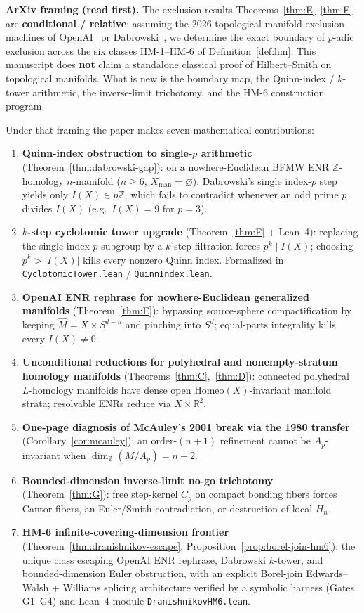 \documentclass[11pt]{article}
\theoremstyle{definition}
\begin{document}
\begin{checkboxenv}
\textbf{ArXiv framing (read first).}
The exclusion results Theorems~\ref{thm:E}--\ref{thm:F} are
\textbf{conditional / relative}: assuming the 2026 topological-manifold
exclusion machines of OpenAI~\cite{openai2026} or
Dabrowski~\cite{dabrowski2026}, we determine the exact boundary of $p$-adic
exclusion across the six classes HM-1--HM-6 of Definition~\ref{def:hm}.
This manuscript does \textbf{not} claim a standalone classical proof of
Hilbert--Smith on topological manifolds.  What is new is the boundary map,
the Quinn-index / $k$-tower arithmetic, the inverse-limit trichotomy, and the
HM-6 construction program.
\end{checkboxenv}

Under that framing the paper makes seven mathematical contributions:
\begin{enumerate}[label=\textbf{C\arabic*.}]
\item \textbf{Quinn-index obstruction to single-$p$ arithmetic}
(Theorem~\ref{thm:dabrowski-gap}):
on a nowhere-Euclidean BFMW ENR $\mathbb{Z}$-homology $n$-manifold
($n\ge 6$, $X_{\mathrm{man}}=\varnothing$), Dabrowski's single index-$p$ step
yields only $I(X)\in p\mathbb{Z}$, which fails to contradict whenever an odd
prime $p$ divides $I(X)$ (e.g.\ $I(X)=9$ for $p=3$).
\item \textbf{$k$-step cyclotomic tower upgrade}
(Theorem~\ref{thm:F} + Lean~4):
replacing the single index-$p$ subgroup by a $k$-step filtration forces
$p^k\mid I(X)$; choosing $p^k>|I(X)|$ kills every nonzero Quinn index.
Formalized in \texttt{CyclotomicTower.lean} / \texttt{QuinnIndex.lean}.
\item \textbf{OpenAI ENR rephrase for nowhere-Euclidean generalized manifolds}
(Theorem~\ref{thm:E}):
bypassing source-sphere compactification by keeping
$\widehat{M}=X\times S^{d-n}$ and pinching into $S^d$; equal-parts
integrality kills every $I(X)\neq 0$.
\item \textbf{Unconditional reductions for polyhedral and nonempty-stratum
homology manifolds}
(Theorems~\ref{thm:C},~\ref{thm:D}):
connected polyhedral $L$-homology manifolds have dense open
$\mathrm{Homeo}(X)$-invariant manifold strata; resolvable ENRs reduce via
$X\times\mathbb{R}^2$.
\item \textbf{One-page diagnosis of McAuley's 2001 break via the 1980 transfer}
(Corollary~\ref{cor:mcauley}):
an order-$(n+1)$ refinement cannot be $A_p$-invariant when
$\dim_{\mathbb{Z}}(M/A_p)=n+2$.
\item \textbf{Bounded-dimension inverse-limit no-go trichotomy}
(Theorem~\ref{thm:G}):
free step-kernel $C_p$ on compact bonding fibers forces Cantor fibers, an
Euler/Smith contradiction, or destruction of local $H_n$.
\item \textbf{HM-6 infinite-covering-dimension frontier}
(Theorem~\ref{thm:dranishnikov-escape},
Proposition~\ref{prop:borel-join-hm6}):
the unique class escaping OpenAI ENR rephrase, Dabrowski $k$-tower, and
bounded-dimension Euler obstruction, with an explicit Borel-join
Edwards--Walsh + Williams splicing architecture verified by a symbolic
harness (Gates G1--G4) and Lean~4 module \texttt{DranishnikovHM6.lean}.
\end{enumerate}
\end{document}
